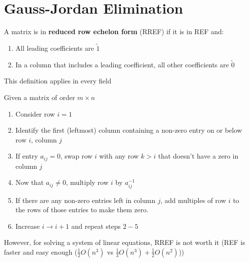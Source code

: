 \section{Gauss-Jordan Elimination}
\begin{definition}[RREF]\label{def:rref}
    A matrix is in \textbf{reduced row echelon form} (RREF) if it is in REF and:
    \begin{enumerate}
        \item All leading coefficients are $\tilde{1}$
        \item In a column that includes a leading coefficient, all other coefficients are $\tilde{0}$
    \end{enumerate}
\end{definition}
\begin{note}
    This definition applies in every field
\end{note}
Given a matrix of order $m \times n$
\begin{enumerate}
    \item Consider row $i=1$
    \item Identify the first (leftmost) column containing a non-zero entry on or below row $i$, column $j$
    \item If entry $a_{ij}=0$, swap row $i$ with any row $k>i$ that doesn't have a zero in column $j$
    \item Now that $a_{ij}\neq 0$, multiply row $i$ by $a_{ij}^{-1}$
    \item If there are any non-zero entries left in column $j$, add multiples of row $i$ to the rows of those entries to make them zero.
    \item Increase $i \to i+1$ and repeat steps $2-5$
\end{enumerate}

However, for solving a system of linear equations, RREF is not worth it (REF is faster and easy enough ($\frac{1}{2}O(n^3)$ vs $\frac{1}{3}O(n^3)+\frac{1}{2}O(n^2)$))